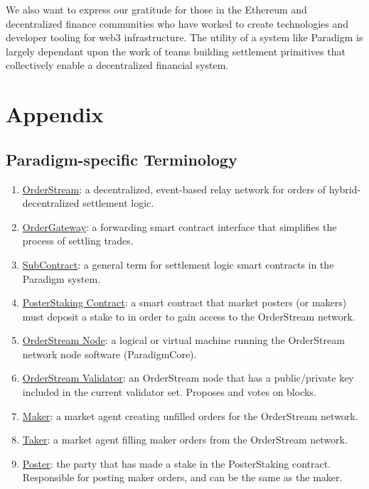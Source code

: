 \documentclass[9pt]{article}
\begin{document}
\noindent We also want to express our gratitude for those in the Ethereum and decentralized finance communities who have worked to create technologies and developer tooling for web3 infrastructure. The utility of a system like Paradigm is largely dependant upon the work of teams building settlement primitives that collectively enable a decentralized financial system.

\clearpage
\pagebreak


\section{Appendix}\label{appendix}

\subsection{Paradigm-specific Terminology}
\begin{enumerate}
\item \underline{OrderStream}: a decentralized, event-based relay network for orders of hybrid-decentralized settlement logic. 
\item \underline{OrderGateway}: a forwarding smart contract interface that simplifies the process of settling trades. 
\item \underline{SubContract}: a general term for settlement logic smart contracts in the Paradigm system.
\item \underline{PosterStaking Contract}: a smart contract that market posters (or makers) must deposit a stake to in order to gain access to the OrderStream network.
\item \underline{OrderStream Node}: a logical or virtual machine running the OrderStream network node software (ParadigmCore).
\item \underline{OrderStream Validator}: an OrderStream node that has a public/private key included in the current validator set. Proposes and votes on blocks. 
\item \underline{Maker}: a market agent creating unfilled orders for the OrderStream network.
\item \underline{Taker}: a market agent filling maker orders from the OrderStream network.
\item \underline{Poster}: the party that has made a stake in the PosterStaking contract. Responsible for posting maker orders, and can be the same as the maker.
\end{enumerate}
\end{document}
